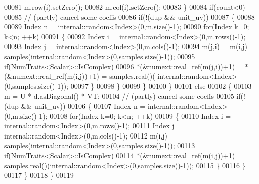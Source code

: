 \begin{DoxyCode}
00081         m.row(i).setZero();
00082         m.col(i).setZero();
00083       \}
00084       \textcolor{keywordflow}{if}(count<0)
00085       \textcolor{comment}{// (partly) cancel some coeffs}
00086       \textcolor{keywordflow}{if}(!(dup && unit\_uv))
00087       \{
00088         
00089         Index n = internal::random<Index>(0,m.size()-1);
00090         \textcolor{keywordflow}{for}(Index k=0; k<n; ++k)
00091         \{
00092           Index i = internal::random<Index>(0,m.rows()-1);
00093           Index j = internal::random<Index>(0,m.cols()-1);
00094           m(j,i) = m(i,j) = samples(internal::random<Index>(0,samples.size()-1));
00095           \textcolor{keywordflow}{if}(NumTraits<Scalar>::IsComplex)
00096             *(&numext::real\_ref(m(j,i))+1) = *(&numext::real\_ref(m(i,j))+1) = samples.real()(
      internal::random<Index>(0,samples.size()-1));
00097         \}
00098       \}
00099     \}
00100   \}
00101   \textcolor{keywordflow}{else}
00102   \{
00103     m = U * d.asDiagonal() * VT;
00104     \textcolor{comment}{// (partly) cancel some coeffs}
00105     \textcolor{keywordflow}{if}(!(dup && unit\_uv))
00106     \{
00107       Index n = internal::random<Index>(0,m.size()-1);
00108       \textcolor{keywordflow}{for}(Index k=0; k<n; ++k)
00109       \{
00110         Index i = internal::random<Index>(0,m.rows()-1);
00111         Index j = internal::random<Index>(0,m.cols()-1);
00112         m(i,j) = samples(internal::random<Index>(0,samples.size()-1));
00113         \textcolor{keywordflow}{if}(NumTraits<Scalar>::IsComplex)
00114           *(&numext::real\_ref(m(i,j))+1) = samples.real()(internal::random<Index>(0,samples.size()-1));
00115       \}
00116     \}
00117   \}
00118 \}
00119 
\end{DoxyCode}
